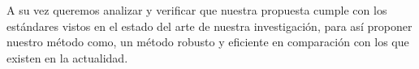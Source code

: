 \documentclass[a4paper,12pt]{article}
\begin{document}
A su vez queremos analizar y verificar que nuestra propuesta cumple con los estándares vistos en el estado del arte de nuestra investigación, para así proponer nuestro método como, un método robusto y eficiente en comparación con los que existen en la actualidad.
%


\end{document}
